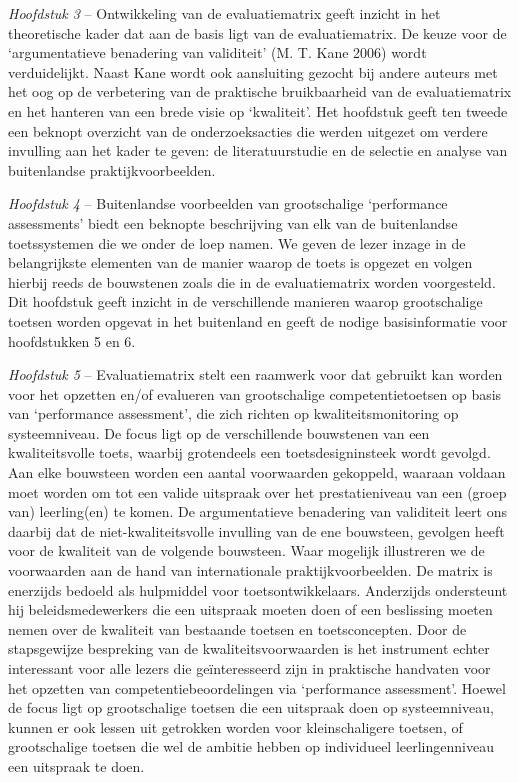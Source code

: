 \documentclass[
  letterpaper,
]{report}
\begin{document}
\emph{Hoofdstuk 3} -- Ontwikkeling van de evaluatiematrix geeft inzicht
in het theoretische kader dat aan de basis ligt van de evaluatiematrix.
De keuze voor de `argumentatieve benadering van validiteit' (M. T. Kane
2006) wordt verduidelijkt. Naast Kane wordt ook aansluiting gezocht bij
andere auteurs met het oog op de verbetering van de praktische
bruikbaarheid van de evaluatiematrix en het hanteren van een brede visie
op `kwaliteit'. Het hoofdstuk geeft ten tweede een beknopt overzicht van
de onderzoeksacties die werden uitgezet om verdere invulling aan het
kader te geven: de literatuurstudie en de selectie en analyse van
buitenlandse praktijkvoorbeelden.

\emph{Hoofdstuk 4} -- Buitenlandse voorbeelden van grootschalige
`performance assessments' biedt een beknopte beschrijving van elk van de
buitenlandse toetssystemen die we onder de loep namen. We geven de lezer
inzage in de belangrijkste elementen van de manier waarop de toets is
opgezet en volgen hierbij reeds de bouwstenen zoals die in de
evaluatiematrix worden voorgesteld. Dit hoofdstuk geeft inzicht in de
verschillende manieren waarop grootschalige toetsen worden opgevat in
het buitenland en geeft de nodige basisinformatie voor hoofdstukken 5 en
6.

\emph{Hoofdstuk 5} -- Evaluatiematrix stelt een raamwerk voor dat
gebruikt kan worden voor het opzetten en/of evalueren van grootschalige
competentietoetsen op basis van `performance assessment', die zich
richten op kwaliteitsmonitoring op systeemniveau. De focus ligt op de
verschillende bouwstenen van een kwaliteitsvolle toets, waarbij
grotendeels een toetsdesigninsteek wordt gevolgd. Aan elke bouwsteen
worden een aantal voorwaarden gekoppeld, waaraan voldaan moet worden om
tot een valide uitspraak over het prestatieniveau van een (groep van)
leerling(en) te komen. De argumentatieve benadering van validiteit leert
ons daarbij dat de niet-kwaliteitsvolle invulling van de ene bouwsteen,
gevolgen heeft voor de kwaliteit van de volgende bouwsteen. Waar
mogelijk illustreren we de voorwaarden aan de hand van internationale
praktijkvoorbeelden. De matrix is enerzijds bedoeld als hulpmiddel voor
toetsontwikkelaars. Anderzijds ondersteunt hij beleidsmedewerkers die
een uitspraak moeten doen of een beslissing moeten nemen over de
kwaliteit van bestaande toetsen en toetsconcepten. Door de stapsgewijze
bespreking van de kwaliteitsvoorwaarden is het instrument echter
interessant voor alle lezers die geïnteresseerd zijn in praktische
handvaten voor het opzetten van competentiebeoordelingen via
`performance assessment'. Hoewel de focus ligt op grootschalige toetsen
die een uitspraak doen op systeemniveau, kunnen er ook lessen uit
getrokken worden voor kleinschaligere toetsen, of grootschalige toetsen
die wel de ambitie hebben op individueel leerlingenniveau een uitspraak
te doen.
\end{document}
